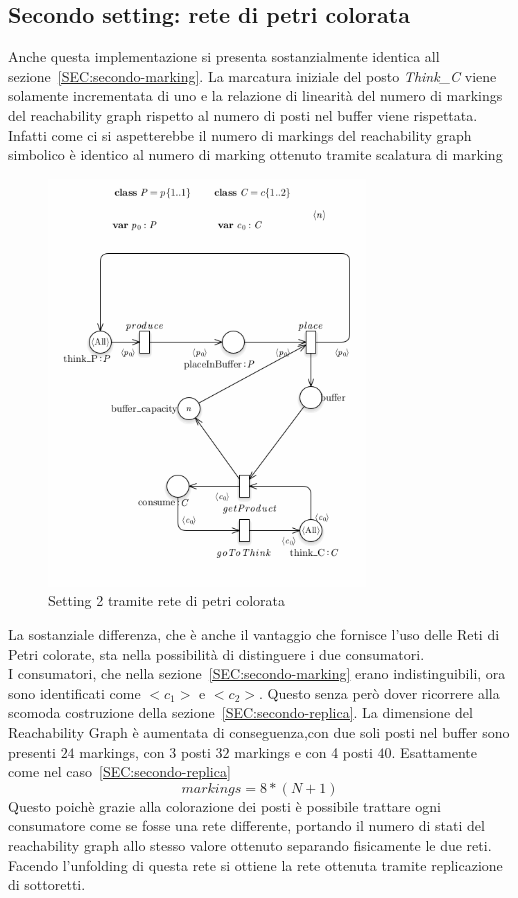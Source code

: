 \documentclass{article}
\begin{document}
\subsection{Secondo setting: rete di petri colorata}
Anche questa implementazione si presenta sostanzialmente identica all sezione~\ref{SEC:secondo-marking}.
La marcatura iniziale del posto \textit{Think\_C} viene solamente incrementata di uno e la relazione di linearità del numero di markings del reachability graph rispetto al numero di posti nel buffer viene rispettata.\\
Infatti come ci si aspetterebbe il numero di markings del reachability graph simbolico è identico al numero di marking ottenuto tramite scalatura di marking
\begin{figure}[!ht]
\centering
\includegraphics[width=0.75\textwidth]{./Esercizio2_img/setting_2_CPN.png}
\caption{Setting 2 tramite rete di petri colorata} \label{FIG:setting2_CPN}
\end{figure}
La sostanziale differenza, che è anche il vantaggio che fornisce l'uso delle Reti di Petri colorate, sta nella possibilità di distinguere i due consumatori.\\
I consumatori, che nella sezione~\ref{SEC:secondo-marking} erano indistinguibili, ora sono identificati come $<c_1>$ e $<c_2>$.
Questo senza però dover ricorrere alla scomoda costruzione della sezione~\ref{SEC:secondo-replica}.
La dimensione del Reachability Graph è aumentata di conseguenza,con due soli posti nel buffer sono presenti $24$ markings, con 3 posti $32$ markings e con 4 posti $40$. Esattamente come nel caso~\ref{SEC:secondo-replica}
$$markings = 8 * (N + 1)$$
Questo poichè grazie alla colorazione dei posti è possibile trattare ogni consumatore come se fosse una rete differente, portando il numero di stati del reachability graph allo stesso valore ottenuto separando fisicamente le due reti.
Facendo l'unfolding di questa rete si ottiene la rete ottenuta tramite replicazione di sottoretti.
\end{document}

